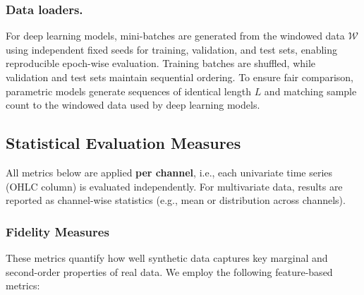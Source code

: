\documentclass[sigconf]{acmart}
\begin{document}
    \subsubsection{Data loaders.} For deep learning models, 
    mini-batches are generated from the windowed data 
    \(\mathcal{W}\) using independent fixed seeds for training, 
    validation, and test sets, enabling reproducible epoch-wise 
    evaluation. Training batches are shuffled, while validation 
    and test sets maintain sequential ordering. To ensure fair 
    comparison, parametric models generate sequences of identical 
    length \(L\) and matching sample count to the windowed data 
    used by deep learning models.


  \subsection{Statistical Evaluation Measures}
    All metrics below are applied \textbf{per channel}, i.e., each 
    univariate time series (OHLC column) is evaluated 
    independently. For multivariate data, results are reported as 
    channel-wise statistics (e.g., mean or distribution across 
    channels).
    
    \subsubsection{Fidelity Measures}
    These metrics quantify how well synthetic data captures key 
    marginal and second-order properties of real data. We employ
    the following feature-based metrics:
\end{document}
